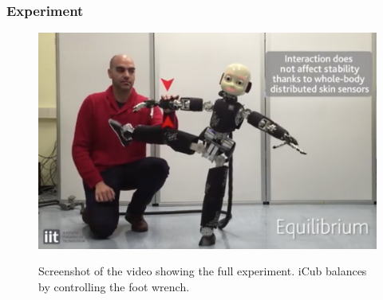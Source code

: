 \documentclass[final,5p,twocolumn]{elsarticle}
\DeclareMathOperator*{\argmin}{argmin}
\begin{document}
%
%

\subsubsection{Experiment}

\begin{figure}
\centering
\includegraphics[width=0.9\columnwidth]{images/icubPicture} \\
\caption{Screenshot of the video showing the full experiment. iCub balances by controlling the foot wrench.
} \label{fig:snapshot}
\end{figure}
\end{document}
